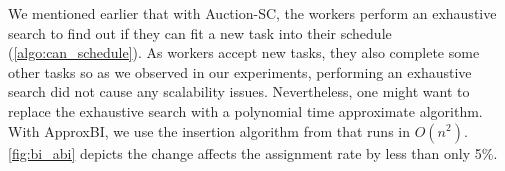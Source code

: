 We mentioned earlier that with Auction-SC, the workers perform an exhaustive search to find out if they can fit a new task into their schedule (\cref{algo:can_schedule}). As workers accept new tasks, they also complete some other tasks so as we observed in our experiments, performing an exhaustive search did not cause any scalability issues. Nevertheless, one might want to replace the exhaustive search with a polynomial time approximate algorithm. With ApproxBI, we use the insertion algorithm from \cite{Rosenkrantz74} that runs in $O(n^2)$. \cref{fig:bi_abi} depicts the change affects the assignment rate by less than only 5\%.


\vspace{-0.05in}
